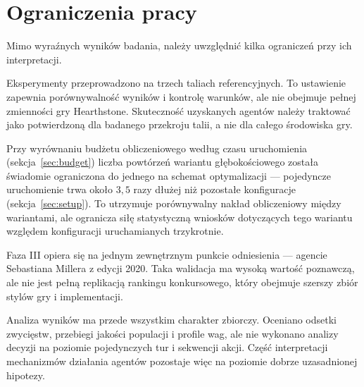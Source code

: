 \section{Ograniczenia pracy}

Mimo wyraźnych wyników badania, należy uwzględnić kilka ograniczeń przy ich interpretacji.

Eksperymenty przeprowadzono na trzech taliach referencyjnych. To ustawienie zapewnia porównywalność wyników i kontrolę warunków, ale nie obejmuje pełnej zmienności gry Hearthstone. Skuteczność uzyskanych agentów należy traktować jako potwierdzoną dla badanego przekroju talii, a nie dla całego środowiska gry.

Przy wyrównaniu budżetu obliczeniowego według czasu uruchomienia (sekcja~\ref{sec:budget}) liczba powtórzeń wariantu głębokościowego została świadomie ograniczona do jednego na schemat optymalizacji --- pojedyncze uruchomienie trwa około \(3{,}5\) razy dłużej niż pozostałe konfiguracje (sekcja~\ref{sec:setup}). To utrzymuje porównywalny nakład obliczeniowy między wariantami, ale ogranicza siłę statystyczną wniosków dotyczących tego wariantu względem konfiguracji uruchamianych trzykrotnie.

Faza III opiera się na jednym zewnętrznym punkcie odniesienia --- agencie Sebastiana Millera z edycji 2020. Taka walidacja ma wysoką wartość poznawczą, ale nie jest pełną replikacją rankingu konkursowego, który obejmuje szerszy zbiór stylów gry i implementacji.

Analiza wyników ma przede wszystkim charakter zbiorczy. Oceniano odsetki zwycięstw, przebiegi jakości populacji i profile wag, ale nie wykonano analizy decyzji na poziomie pojedynczych tur i sekwencji akcji. Część interpretacji mechanizmów działania agentów pozostaje więc na poziomie dobrze uzasadnionej hipotezy.

